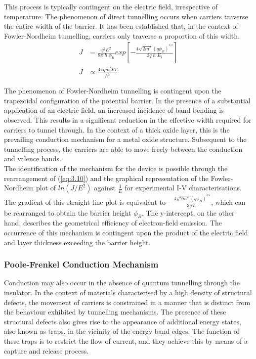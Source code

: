 \noindent This process is typically contingent on the electric field, irrespective of temperature. The phenomenon of direct tunnelling occurs when carriers traverse the entire width of the barrier. It has been established that, in the context of Fowler-Nordheim tunnelling, carriers only traverse a proportion of this width.
\begin{align}
    J &= \frac{q^2E^2}{8\pi\hslash\phi _B} exp \left[  -\frac{4\sqrt{2m^{*}}(q\phi _{B})^{^{3/2}}}{3q\hslash E_{i}} \right] \label{eq:3.10} \\
    J &\propto \frac{4\pi q m^* kT}{\hslash^3} \label{eq:3.11}
\end{align}

\noindent The phenomenon of Fowler-Nordheim tunnelling is contingent upon the trapezoidal configuration of the potential barrier. In the presence of a substantial application of an electric field, an increased incidence of band-bending is observed. This results in a significant reduction in the effective width required for carriers to tunnel through. In the context of a thick oxide layer, this is the prevailing conduction mechanism for a metal oxide structure. Subsequent to the tunnelling process, the carriers are able to move freely between the conduction and valence bands.\\

\noindent The identification of the mechanism for the device is possible through the rearrangement of (\ref{eq:3.10}) and the graphical representation of the Fowler-Nordheim plot of $ln(J/E^2)$ against $\frac{1}{E}$ for experimental I-V characterisations. The gradient of this straight-line plot is equivalent to $-\frac{4\sqrt{2m^{*}}(q\phi _{B})^{^{3/2}}}{3q\hslash}$, which can be rearranged to obtain the barrier height $\phi_B$. The y-intercept, on the other hand, describes the geometrical efficiency of electron-field emission. The occurrence of this mechanism is contingent upon the product of the electric field and layer thickness exceeding the barrier height.

\subsubsection[Poole-Frenkel Conduction Mechanism]{Poole-Frenkel Conduction Mechanism}

\noindent Conduction may also occur in the absence of quantum tunnelling through the insulator. In the context of materials characterised by a high density of structural defects, the movement of carriers is constrained in a manner that is distinct from the behaviour exhibited by tunnelling mechanisms. The presence of these structural defects also gives rise to the appearance of additional energy states, also known as traps, in the vicinity of the energy band edges. The function of these traps is to restrict the flow of current, and they achieve this by means of a capture and release process.\\

